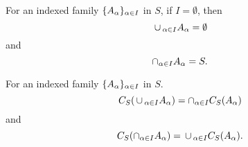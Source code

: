 \begin{prop}
  For an indexed family $\{A_{\alpha}\}_{\alpha \in I}$ in $S$, if $I = \emptyset$, then
  \[
    \,\cup\,_{\alpha \in I} A_{\alpha} = \emptyset
  \]
  and
  \[
    \cap_{\alpha \in I} A_{\alpha} = S.
  \]
\end{prop}

\begin{prop}
  For an indexed family $\{A_{\alpha}\}_{\alpha \in I}$ in $S$.
  \[
    C_S(\,\cup\,_{\alpha \in I} A_{\alpha}) = \cap_{\alpha \in I} C_S(A_{\alpha})
  \]
  and
  \[
    C_S(\cap_{\alpha \in I} A_{\alpha}) = \,\cup\,_{\alpha \in I} C_S(A_{\alpha}).
  \]
\end{prop}


